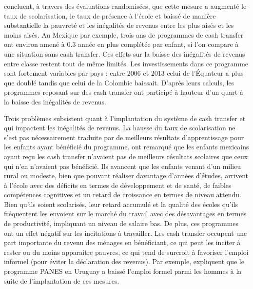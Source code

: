 \documentclass[pagesize, twoside=off, bibliography=totoc, DIV=calc, fontsize=12pt, a4paper, french]{scrartcl}
\begin{document}
 concluent, à travers des évaluations randomisées, que cette mesure a augmenté le taux de scolarisation, le taux de présence à l’école et baissé de manière substantielle la pauvreté et les inégalités de revenus entre les plus aisés et les moins aisés. Au Mexique par exemple, trois ans de programmes de cash transfer ont environ amené à 0.3 année en plus complétée par enfant, si l’on compare à une situation sans cash transfer. Ces effets sur la baisse des inégalités de revenus entre classe restent tout de même limités. Les investissements dans ce programme sont fortement variables par pays : entre 2006 et 2013 celui de l’Équateur a plus que doublé tandis que celui de la Colombie baissait. D’après leurs calculs, les programmes reposant sur des cash transfer ont participé à hauteur d’un quart à la baisse des inégalités de revenus.

Trois problèmes subsistent quant à l’implantation du système de cash transfer et qui impactent les inégalités de revenus. La hausse du taux de scolarisation ne s’est pas nécessairement traduite par de meilleurs résultats d’apprentissage pour les enfants ayant bénéficié du programme.  ont remarqué que les enfants mexicains ayant reçu les cash transfer n’avaient pas de meilleurs résultats scolaires que ceux qui n’en n’avaient pas bénéficié. Ils avancent que les enfants venant d’un milieu rural ou modeste, bien que pouvant réaliser davantage d’années d’études, arrivent à l’école avec des déficits en termes de développement et de santé, de faibles compétences cognitives et un retard de croissance en termes de niveau attendu. Bien qu’ils soient scolarisés, leur retard accumulé et la qualité des écoles qu’ils fréquentent les envoient sur le marché du travail avec des désavantages en termes de productivité, impliquant un niveau de salaire bas. De plus, ces programmes ont un effet négatif sur les incitations à travailler. Les cash transfer occupent une part importante du revenu des ménages en bénéficiant, ce qui peut les inciter à rester ou du moins apparaitre pauvres, ce qui tend de surcroit à favoriser l’emploi informel (pour éviter la déclaration des revenus). Par exemple, \citet{amarante_2011} expliquent que le programme PANES en Uruguay a baissé l’emploi formel parmi les hommes à la suite de l’implantation de ces mesures. 
\end{document}
